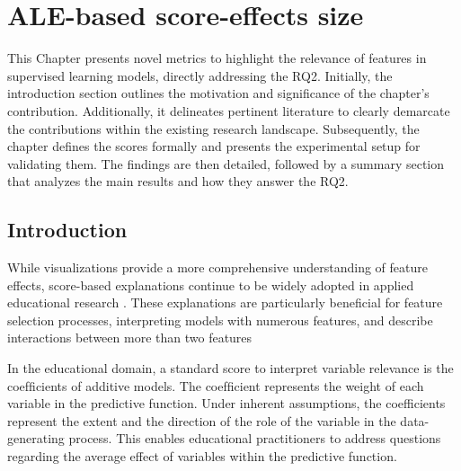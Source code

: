 \chapter{ALE-based score-effects size}
\label{chapter4}

This Chapter presents novel metrics to highlight the relevance of features in supervised learning models, directly addressing the RQ2. Initially, the introduction section outlines the motivation and significance of the chapter's contribution. Additionally, it delineates pertinent literature to clearly demarcate the contributions within the existing research landscape. Subsequently, the chapter defines the scores formally and presents the experimental setup for validating them. The findings are then detailed, followed by a summary section that analyzes the main results and how they answer the RQ2.


\begin{center}
\end{center}

\section{Introduction}

While visualizations provide a more comprehensive understanding of feature effects, score-based explanations continue to be widely adopted in applied educational research \cite{SilvaFilho2023AAchievement}. These explanations are particularly beneficial for feature selection processes, interpreting models with numerous features, and \cite{Wei2015VariableReview,SilvaFilho2021InterpretingEffects} describe interactions between more than two features \cite{Apley2020VisualizingModels}

In the educational domain, a standard score to interpret variable relevance is the coefﬁcients of additive models. The coefﬁcient represents the weight of each variable in the predictive function. Under inherent assumptions, the coefficients represent the extent and the direction of the role of the variable in the data-generating process. This enables educational practitioners to address questions regarding the average effect of variables within the predictive function.

